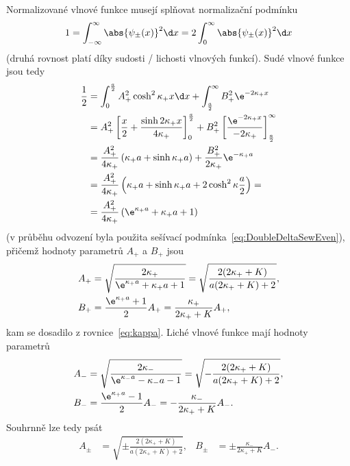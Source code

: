 \begin{solution}
\begin{enumerate}
		Normalizované vlnové funkce musejí splňovat normalizační podmínku
		\begin{equation}
			1=\int_{-\infty}^{\infty}\abs{\psi_{\pm}(x)}^{2}\d x
			 =2\int_{0}^{\infty}\abs{\psi_{\pm}(x)}^{2}\d x
		\end{equation}
        (druhá rovnost platí díky sudosti / lichosti vlnových funkcí).
        Sudé vlnové funkce jsou tedy
		\begin{align}
			\frac{1}{2}
				&=\int_{0}^{\frac{a}{2}}A_{+}^{2}\cosh^{2}{\kappa_{+}x}\d x
					+\int_{\frac{a}{2}}^{\infty}B_{+}^{2}\e^{-2\kappa_{+}x}\nonumber\\
				&=A_{+}^{2}\left[\frac{x}{2}+\frac{\sinh{2\kappa_{+}x}}{4\kappa_{+}}\right]
					_{0}^{\frac{a}{2}}+B_{+}^{2}\left[\frac{\e^{-2\kappa_{+}x}}{-2\kappa_{+}}\right]
					_{\frac{a}{2}}^{\infty}\nonumber\\
				&=\frac{A_{+}^{2}}{4\kappa_{+}}\left(\kappa_{+}a+\sinh{\kappa_{+}a}\right)
					+\frac{B_{+}^{2}}{2\kappa_{+}}\e^{-\kappa_{+}a}\nonumber\\
				&=\frac{A_{+}^{2}}{4\kappa_{+}}\left(\kappa_{+}a+\sinh{\kappa_{+}a}
					+2\cosh^{2}{\kappa\frac{a}{2}}\right)=\nonumber\\
				&=\frac{A_{+}^{2}}{4\kappa_{+}}\left(\e^{\kappa_{+}a}+\kappa_{+}a+1\right)
		\end{align}
		(v průběhu odvození byla použita sešívací podmínka~\eqref{eq:DoubleDeltaSewEven}), přičemž hodnoty parametrů $A_{+}$ a $B_{+}$ jsou
		\begin{subequations}
			\begin{align}
				A_{+}
					&=\sqrt{\frac{2\kappa_{+}}{\e^{\kappa_{+}a}+\kappa_{+}a+1}}
					=\sqrt{\frac{2(2\kappa_{+}+K)}{a(2\kappa_{+}+K)+2}},\nonumber\\
				B_{+}
					&=\frac{\e^{\kappa_{+}a}+1}{2}A_{+}
					=\frac{\kappa_{+}}{2\kappa_{+}+K}A_{+},
			\end{align}
		\end{subequations}
		kam se dosadilo z rovnice~\eqref{eq:kappa}.
		Liché vlnové funkce mají hodnoty parametrů
		\begin{subequations}
			\begin{align}
				A_{-}
					&=\sqrt{\frac{2\kappa_{-}}{\e^{\kappa_{-}a}-\kappa_{-}a-1}}
					=\sqrt{-\frac{2(2\kappa_{+}+K)}{a(2\kappa_{+}+K)+2}},\nonumber\\
				B_{-}
					&=\frac{\e^{\kappa_{+}a}-1}{2}A_{-}
					=-\frac{\kappa_{-}}{2\kappa_{+}+K}A_{-}.			
			\end{align}
		\end{subequations}
		Souhrnně lze tedy psát
		\begin{align}
			A_{\pm}&=\sqrt{\pm\frac{2(2\kappa_{+}+K)}{a(2\kappa_{+}+K)+2}}, & 
			B_{\pm}&=\pm\frac{\kappa_{-}}{2\kappa_{+}+K}A_{-}.			
		\end{align}
		

\end{enumerate}
\end{solution}
